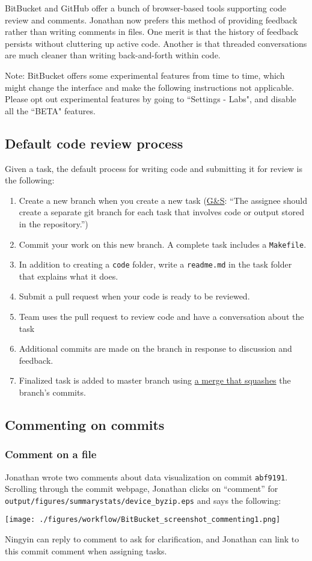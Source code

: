 BitBucket and GitHub offer a bunch of browser-based tools supporting code review and comments. 
Jonathan now prefers this method of providing feedback rather than writing comments in files.
One merit is that the history of feedback persists without cluttering up active code.
Another is that threaded conversations are much cleaner than writing back-and-forth within code.

Note: BitBucket offers some experimental features from time to time, 
which might change the interface and make the following instructions not applicable. 
Please opt out experimental features by going to ``Settings - Labs", 
and disable all the ``BETA" features.

\subsection{Default code review process}
Given a task, the default process for writing code and submitting it for review is the following:
\begin{enumerate}
\item Create a new branch when you create a new task (\href{https://github.com/gslab-econ/ra-manual/wiki/Tasks}{G\&S}: ``The assignee should create a separate git branch for each task that involves code or output stored in the repository.'')
\item Commit your work on this new branch. A complete task includes a \texttt{Makefile}.
\item In addition to creating a \texttt{code} folder, write a \texttt{readme.md} in the task folder that explains what it does.
\item Submit a pull request when your code is ready to be reviewed.
\item Team uses the pull request to review code and have a conversation about the task
\item Additional commits are made on the branch in response to discussion and feedback.
\item Finalized task is added to master branch using \href{https://bitbucket.org/blog/git-squash-commits-merging-bitbucket}{a merge that squashes} the branch's commits.
\end{enumerate}


\subsection{Commenting on commits}

\subsubsection{Comment on a file}
Jonathan wrote two comments about data visualization on commit \texttt{abf9191}.
Scrolling through the commit webpage, Jonathan clicks on ``comment'' for \texttt{output/figures/summarystats/device\_byzip.eps} and says the following:
\begin{center}\texttt{[image: ./figures/workflow/BitBucket\_screenshot\_commenting1.png]}\end{center}
Ningyin can reply to comment to ask for clarification, and Jonathan can link to this commit comment when assigning tasks.

